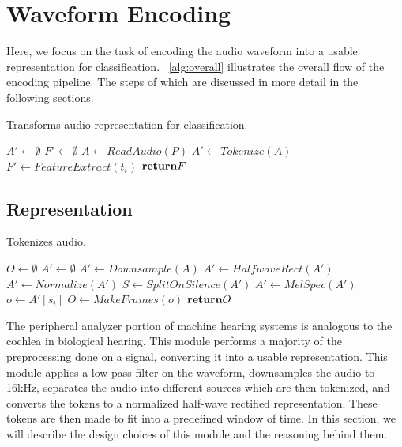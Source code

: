 \section{Waveform Encoding}

Here, we focus on the task of encoding the audio waveform into a usable representation for classification.
~\cref{alg:overall} illustrates the overall flow of the encoding pipeline. 
The steps of which are discussed in more detail in the following sections.

\begin{algorithm}
    \caption{Transforms audio representation for classification.}\label{encoder}
    \SetAlgoLined
    
     {
        $A' \gets \emptyset$\;
        $F' \gets \emptyset$\;
        $A \gets ReadAudio(P)$\;
        $A' \gets Tokenize(A)$\;
         {
            $F' \gets FeatureExtract(t_i)$\;
        }
        $\Return F$\;
    }
    \label{alg:overall}
\end{algorithm}

\subsection{Representation}

\begin{algorithm}[b]
    \caption{Tokenizes audio.}\label{encoder}
    \SetAlgoLined
    
     {
        $O \gets \emptyset$\;
        $A' \gets \emptyset$\;
        $A' \gets Downsample(A)$\;
        $A' \gets HalfwaveRect(A')$\;
        $A' \gets Normalize(A')$\;
        $S \gets SplitOnSilence(A')$\;
        $A' \gets MelSpec(A')$\;
         {
            $o \gets A'[s_i]$\;
            $O \gets MakeFrames(o)$\;
        }
        $\Return O$\;
    }
\end{algorithm}

The peripheral analyzer portion of machine hearing systems is analogous to the cochlea in biological hearing. This module performs a majority of the preprocessing done on a signal, converting it into a usable representation. This module applies a low-pass filter on the waveform, downsamples the audio to 16kHz, separates the audio into different sources which are then tokenized, and converts the tokens to a normalized half-wave rectified representation. These tokens are then made to fit into a predefined window of time. In this section, we will describe the design choices of this module and the reasoning behind them.

